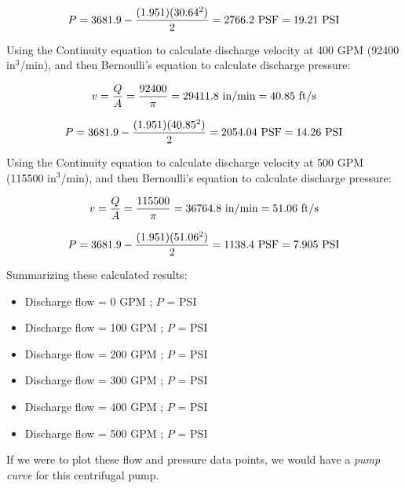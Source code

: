 $$P = 3681.9 - {(1.951) (30.64^2) \over 2} = 2766.2 \hbox{ PSF} = 19.21 \hbox{ PSI}$$

\vskip 20pt

Using the Continuity equation to calculate discharge velocity at 400 GPM (92400 in$^{3}$/min), and then Bernoulli's equation to calculate discharge pressure:

$$v = {Q \over A} = {92400 \over \pi} = 29411.8 \hbox{ in/min} = 40.85 \hbox{ ft/s}$$

$$P = 3681.9 - {(1.951) (40.85^2) \over 2} = 2054.04 \hbox{ PSF} = 14.26 \hbox{ PSI}$$

\vskip 20pt

Using the Continuity equation to calculate discharge velocity at 500 GPM (115500 in$^{3}$/min), and then Bernoulli's equation to calculate discharge pressure:

$$v = {Q \over A} = {115500 \over \pi} = 36764.8 \hbox{ in/min} = 51.06 \hbox{ ft/s}$$

$$P = 3681.9 - {(1.951) (51.06^2) \over 2} = 1138.4 \hbox{ PSF} = 7.905 \hbox{ PSI}$$

\vskip 20pt

\noindent
Summarizing these calculated results:

\begin{itemize}
\item{} Discharge flow = 0 GPM ; $P$ =  PSI
\vskip 5pt
\item{} Discharge flow = 100 GPM ; $P$ =  PSI 
\vskip 5pt
\item{} Discharge flow = 200 GPM ; $P$ =  PSI 
\vskip 5pt
\item{} Discharge flow = 300 GPM ; $P$ =  PSI 
\vskip 5pt
\item{} Discharge flow = 400 GPM ; $P$ =  PSI 
\vskip 5pt
\item{} Discharge flow = 500 GPM ; $P$ =  PSI 
\end{itemize}

\vskip 10pt

If we were to plot these flow and pressure data points, we would have a {\it pump curve} for this centrifugal pump.













